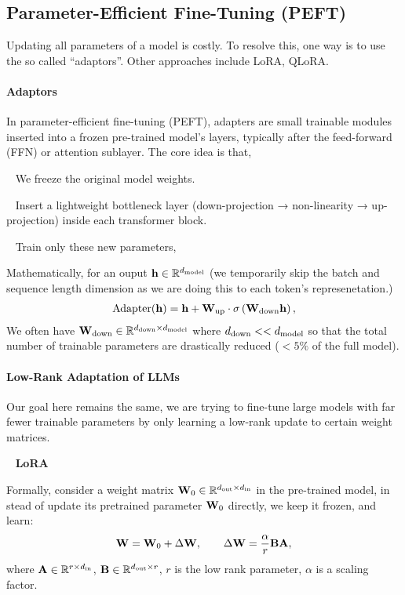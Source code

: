 \documentclass[11pt]{article}  %
\begin{document}
\subsection{Parameter-Efficient Fine-Tuning (PEFT)}  Updating all parameters of a model is costly. 
To resolve this, one way is to use the so called ``adaptors''.
Other approaches include LoRA, QLoRA.

\paragraph{Adaptors} In parameter-efficient fine-tuning (PEFT), adapters are small trainable modules inserted into a frozen pre-trained model's layers, typically after the feed-forward (FFN) or attention sublayer.
The core idea is that, 

\textbullet~ We freeze the original model weights.

\textbullet~ Insert a lightweight bottleneck layer (down-projection → non-linearity → up-projection) inside each transformer block.

\textbullet~ Train only these new parameters,

Mathematically, for an ouput $\mathbf{h} \in \mathbb{R}^{d_{\text{model}}}$ (we temporarily skip the batch and sequence length dimension as we are doing this to each token's represenetation.)
\begin{align*}
  \text{Adapter}(\mathbf{h}) = \mathbf{h} + \mathbf{W}_{\text{up}} \cdot \sigma\left( \mathbf{W}_{\text{down}}\mathbf{h} \right), 
\end{align*}
We often have $\mathbf{W}_{\text{down}} \in \mathbb{R}^{d_{\text{down}} \times d_{\text{model}}}$ where $d_{\text{down}} << d_{\text{model}}$ so that the total number of trainable parameters are drastically reduced ($<5\%$ of the full model).


\paragraph{Low-Rank Adaptation of LLMs} Our goal here remains the same, we are trying to fine-tune large models with far fewer trainable parameters by only learning a low-rank update to certain weight matrices.

\textbullet~ \textbf{LoRA}

Formally, consider a weight matrix $\mathbf{W}_0 \in \mathbb{R}^{d_{\text{out}} \times d_{\text{in}}}$ in the pre-trained model, in stead of update its pretrained parameter $\mathbf{W}_0$ directly, we keep it frozen, and learn: 
\begin{align*}
  \mathbf{W} = \mathbf{W}_0 + \Delta \mathbf{W}, \qquad \Delta \mathbf{W} = \frac{\alpha}{r}\mathbf{B}\mathbf{A},
\end{align*}
where $\mathbf{A} \in \mathbb{R}^{r \times d_{\text{in}}}$, $\mathbf{B} \in \mathbb{R}^{d_{\text{out}} \times r}$, $r$ is the low rank parameter, $\alpha$ is a scaling factor.
\end{document}
